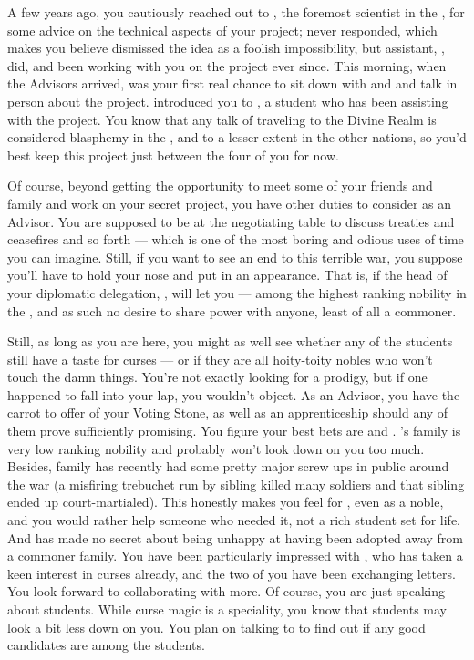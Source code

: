 \documentclass[char]{GL2020}
\begin{document}
A few years ago, you cautiously reached out to \cHeadScientist{\full}, the foremost scientist in the \pTech{}, for some advice on the technical aspects of your project; \cHeadScientist{\they} never responded, which makes you believe \cHeadScientist{\they} dismissed the idea as a foolish impossibility, but \cHeadScientist{\their} assistant, \cAssistantScientist{\full}, did, and \cAssistantScientist{\theyhave} been working with you on the project ever since. This morning, when the Advisors arrived, was your first real chance to sit down with \cFlowPriest{} and \cAssistantScientist{} and talk in person about the project. \cFlowPriest{\They} introduced you to \cAmbition{\full}, a student who has been assisting \cFlowPriest{\them} with the project. You know that any talk of traveling to the Divine Realm is considered blasphemy in the \pFarm{}, and to a lesser extent in the other nations, so you'd best keep this project just between the four of you for now.

Of course, beyond getting the opportunity to meet some of your friends and family and work on your secret project, you have other duties to consider as an Advisor. You are supposed to be at the negotiating table to discuss treaties and ceasefires and so forth — which is one of the most boring and odious uses of time you can imagine. Still, if you want to see an end to this terrible war, you suppose you'll have to hold your nose and put in an appearance. That is, if the head of your diplomatic delegation, \cEvil{\full}, will let you — \cEvil{\theyare} among the highest ranking nobility in the \pFarm{}, and as such \cEvil{\have} no desire to share power with anyone, least of all a commoner. 

Still, as long as you are here, you might as well see whether any of the students still have a taste for curses — or if they are all hoity-toity nobles who won't touch the damn things. You're not exactly looking for a prodigy, but if one happened to fall into your lap, you wouldn't object. As an Advisor, you have the carrot to offer of your Voting Stone, as well as an apprenticeship should any of them prove sufficiently promising. You figure your best bets are \cLibAssist{\full} and \cAdopted{\full}. \cLibAssist{}'s family is very low ranking nobility and probably won't look down on you too much. Besides, \cLibAssist{\their} family has recently had some pretty major screw ups in public around the war (a misfiring trebuchet run by \cLibAssist{\their} sibling killed many soldiers and that sibling ended up court-martialed). This honestly makes you feel for \cLibAssist{\them}, even as a noble, and you would rather help someone who needed it, not a rich student set for life. And \cAdopted{} has made no secret about being unhappy at having been adopted away from a commoner family. You have been particularly impressed with \cAdopted{}, who has taken a keen interest in curses already, and the two of you have been exchanging letters. You look forward to collaborating with \cAdopted{\them} more. Of course, you are just speaking about \pFarm{} students. While curse magic is a \pFarm{} speciality, you know that \pTech{} students may look a bit less down on you. You plan on talking to \cAssistantScientist{} to find out if any good candidates are among the \pTech{} students.
\end{document}

